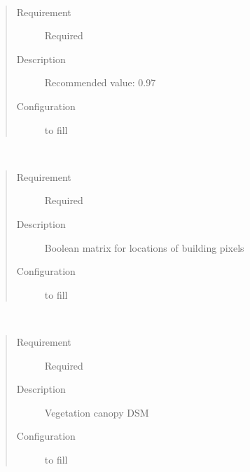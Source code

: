 \documentclass[letterpaper,10pt,english]{sphinxmanual}
\begin{document}

\begin{fulllineitems}
\label{\detokenize{input_files/SOLWEIG_input/SOLWEIGinput:cmdoption-arg-absl}}~\begin{quote}\begin{description}
\item[{Requirement}] \leavevmode
Required

\item[{Description}] \leavevmode
Recommended value: 0.97

\item[{Configuration}] \leavevmode
to fill

\end{description}\end{quote}

\end{fulllineitems}


\begin{fulllineitems}
\label{\detokenize{input_files/SOLWEIG_input/SOLWEIGinput:cmdoption-arg-buildingname}}~\begin{quote}\begin{description}
\item[{Requirement}] \leavevmode
Required

\item[{Description}] \leavevmode
Boolean matrix for locations of building pixels

\item[{Configuration}] \leavevmode
to fill

\end{description}\end{quote}

\end{fulllineitems}


\begin{fulllineitems}
\label{\detokenize{input_files/SOLWEIG_input/SOLWEIGinput:cmdoption-arg-cdsmname}}~\begin{quote}\begin{description}
\item[{Requirement}] \leavevmode
Required

\item[{Description}] \leavevmode
Vegetation canopy DSM

\item[{Configuration}] \leavevmode
to fill

\end{description}\end{quote}

\end{fulllineitems}
\end{document}
